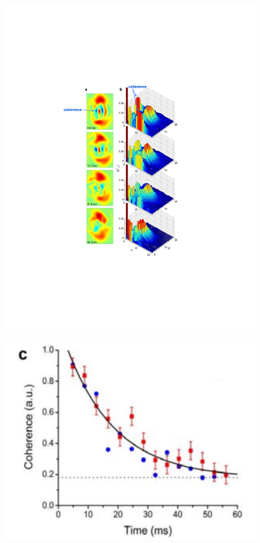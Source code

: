 \documentclass[3p,sort&compress]{elsarticle}
\begin{document}
\begin{figure}
\centering
\includegraphics[scale=0.9]{ty1.pdf} \,\,\, \includegraphics[scale=0.18]{wert6.pdf} 

\end{figure}
\end{document}
